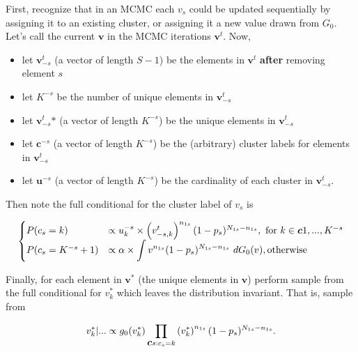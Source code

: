 \documentclass[12pt]{article}
\newcommand{\bc}{\mbox{\boldmath $c$}}
\begin{document}
\noindent
First, recognize that in an MCMC each $v_s$ could be updated sequentially by assigning it to an existing cluster,
or assigning it a new value drawn from $G_0$. Let's call the current $\bm v$ in the MCMC iterations $\bm v^t$. Now,

\def\vt{\bm v^t}
\def\vstar{ \vt_{-s}\mbox{*} }

\begin{itemize}
  \item let $\vt_{-s}$ (a vector of length $S-1$) be the elements in $\vt$ \textbf{after} removing element $s$
  \item let $K^{-s}$ be the number of unique elements in $\vt_{-s}$ 
  \item let $\vstar$ (a vector of length $K^{-s}$) be the unique elements in $\vt_{-s}$
  \item let $\bm c^{-s}$ (a vector of length $K^{-s}$) be the (arbitrary) cluster labels for elements in $\vt_{-s}$
  \item let $\bm u^{-s}$ (a vector of length $K^{-s}$) be the cardinality of each cluster in $\vt_{-s}$.
\end{itemize}
Then note the full conditional for the cluster label of $v_s$ is 

$$
\begin{cases}
  P(c_s = k) & \propto u^{-s}_k \times \p{v_{-s,k}^{t}}^{n_{1s}} (1-p_s)^{N_{1s}-n_{1s}}, \text{ for } k \in \bc{1,...,K^{-s}}\\
  P(c_s = K^{-s}+1) & \propto \alpha \times \ds\int v^{n_{1s}} (1-p_s)^{N_{1s}-n_{1s}} ~dG_0(v), \text{otherwise}
\end{cases}
$$

\noindent
Finally, for each element in $\bm v^*$ (the unique elements in $\bm v$) perform sample from the full conditional for $v_k^*$
which leaves the distribution invariant. That is, sample from

$$
v_k^* | ... \propto g_0(v_k^*) \prod_{\bc{s:c_s=k}} \p{v_k^*}^{n_{1s}}(1-p_s)^{N_{1s}-n_{1s}}.
$$


\end{document}
